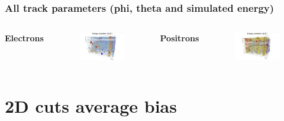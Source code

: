 \documentclass{beamer}
\begin{document}
	\begin{frame}
		\frametitle{All track parameters (phi, theta and simulated energy)}		
		\begin{columns}
			\centering
			\Large \textbf{Electrons}
			\begin{figure}
				\centering
				\includegraphics[width = 0.95 \linewidth]{../images/c_e_all.png}
			\end{figure}
			\centering
			\Large \textbf{Positrons}
			\begin{figure}
				\centering
				\includegraphics[width = 0.95 \linewidth]{../images/c_p_all.png}
			\end{figure}
		\end{columns}
	\end{frame}
	
	
	\section{2D cuts average bias}
	
\end{document}
